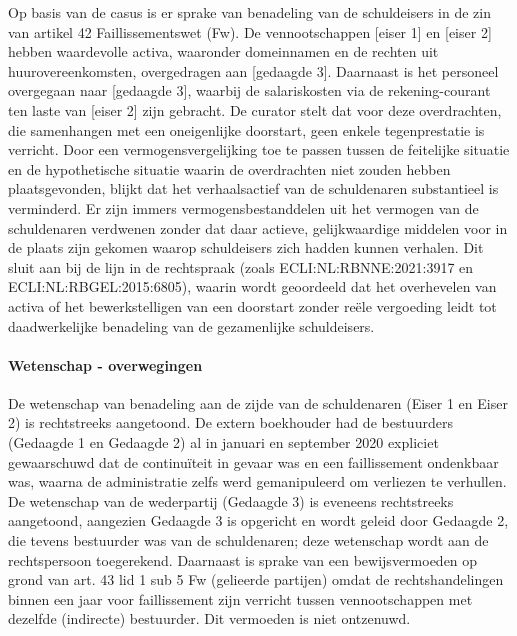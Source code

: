 \documentclass[
  dutch,
  a4paper,
]{article}
\begin{document}
Op basis van de casus is er sprake van benadeling van de schuldeisers in de zin van artikel 42 Faillissementswet (Fw). De vennootschappen {[}eiser 1{]} en {[}eiser 2{]} hebben waardevolle activa, waaronder domeinnamen en de rechten uit huurovereenkomsten, overgedragen aan {[}gedaagde 3{]}. Daarnaast is het personeel overgegaan naar {[}gedaagde 3{]}, waarbij de salariskosten via de rekening-courant ten laste van {[}eiser 2{]} zijn gebracht. De curator stelt dat voor deze overdrachten, die samenhangen met een oneigenlijke doorstart, geen enkele tegenprestatie is verricht. Door een vermogensvergelijking toe te passen tussen de feitelijke situatie en de hypothetische situatie waarin de overdrachten niet zouden hebben plaatsgevonden, blijkt dat het verhaalsactief van de schuldenaren substantieel is verminderd. Er zijn immers vermogensbestanddelen uit het vermogen van de schuldenaren verdwenen zonder dat daar actieve, gelijkwaardige middelen voor in de plaats zijn gekomen waarop schuldeisers zich hadden kunnen verhalen. Dit sluit aan bij de lijn in de rechtspraak (zoals ECLI:NL:RBNNE:2021:3917 en ECLI:NL:RBGEL:2015:6805), waarin wordt geoordeeld dat het overhevelen van activa of het bewerkstelligen van een doorstart zonder reële vergoeding leidt tot daadwerkelijke benadeling van de gezamenlijke schuldeisers.

\paragraph{Wetenschap - overwegingen}\label{wetenschap---overwegingen-26}

De wetenschap van benadeling aan de zijde van de schuldenaren (Eiser 1 en Eiser 2) is rechtstreeks aangetoond. De extern boekhouder had de bestuurders (Gedaagde 1 en Gedaagde 2) al in januari en september 2020 expliciet gewaarschuwd dat de continuïteit in gevaar was en een faillissement ondenkbaar was, waarna de administratie zelfs werd gemanipuleerd om verliezen te verhullen. De wetenschap van de wederpartij (Gedaagde 3) is eveneens rechtstreeks aangetoond, aangezien Gedaagde 3 is opgericht en wordt geleid door Gedaagde 2, die tevens bestuurder was van de schuldenaren; deze wetenschap wordt aan de rechtspersoon toegerekend. Daarnaast is sprake van een bewijsvermoeden op grond van art. 43 lid 1 sub 5 Fw (gelieerde partijen) omdat de rechtshandelingen binnen een jaar voor faillissement zijn verricht tussen vennootschappen met dezelfde (indirecte) bestuurder. Dit vermoeden is niet ontzenuwd.

\newpage
\end{document}
